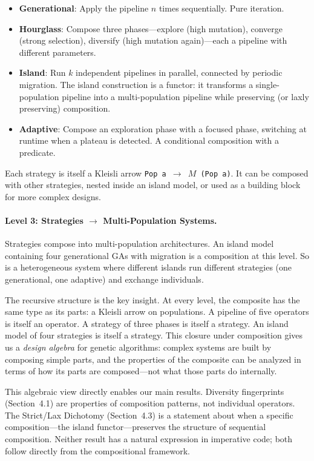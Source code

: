 \documentclass[sigconf,anonymous]{acmart}
\begin{document}
\begin{itemize}[nosep]
  \item \textbf{Generational}: Apply the pipeline $n$ times sequentially. Pure iteration.
  \item \textbf{Hourglass}: Compose three phases---explore (high mutation), converge (strong selection), diversify (high mutation again)---each a pipeline with different parameters.
  \item \textbf{Island}: Run $k$ independent pipelines in parallel, connected by periodic migration. The island construction is a functor: it transforms a single-population pipeline into a multi-population pipeline while preserving (or laxly preserving) composition.
  \item \textbf{Adaptive}: Compose an exploration phase with a focused phase, switching at runtime when a plateau is detected. A conditional composition with a predicate.
\end{itemize}

\noindent Each strategy is itself a Kleisli arrow \texttt{Pop\,a $\to$ $M$\,(Pop\,a)}. It can be composed with other strategies, nested inside an island model, or used as a building block for more complex designs.

\paragraph{Level 3: Strategies $\to$ Multi-Population Systems.}
Strategies compose into multi-population architectures. An island model containing four generational GAs with migration is a composition at this level. So is a heterogeneous system where different islands run different strategies (one generational, one adaptive) and exchange individuals.

The recursive structure is the key insight. At every level, the composite has the same type as its parts: a Kleisli arrow on populations. A pipeline of five operators is itself an operator. A strategy of three phases is itself a strategy. An island model of four strategies is itself a strategy. This closure under composition gives us a \emph{design algebra} for genetic algorithms: complex systems are built by composing simple parts, and the properties of the composite can be analyzed in terms of how its parts are composed---not what those parts do internally.

This algebraic view directly enables our main results. Diversity fingerprints (Section~4.1) are properties of composition patterns, not individual operators. The Strict/Lax Dichotomy (Section~4.3) is a statement about when a specific composition---the island functor---preserves the structure of sequential composition. Neither result has a natural expression in imperative code; both follow directly from the compositional framework.
\end{document}
